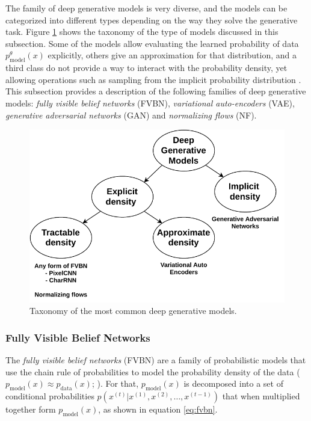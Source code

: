 The family of deep generative models is very diverse, and the models can be categorized into different types depending on the way they solve the generative task. Figure \ref{fig:generativetaxonomy} shows the taxonomy of the type of models discussed in this subsection. Some of the models allow evaluating the learned probability of data $p^\theta_\mathrm{model}(x)$ explicitly, others give an approximation for that distribution, and a third class do not provide a way to interact with the probability density, yet allowing operations such as sampling from the implicit probability distribution \autocite{Goodfellow2016}. This subsection provides a description of the following families of deep generative models: \textit{fully visible belief networks} (FVBN), \textit{variational auto-encoders} (VAE), \textit{generative adversarial networks} (GAN) and \textit{normalizing flows} (NF).

\begin{figure}[h!]
	\centering
	\includegraphics[width=0.85\linewidth]{background/images/generativetaxonomy}
	\caption[Taxonomy of deep generative models]{Taxonomy of the most common deep generative models.}
	\label{fig:generativetaxonomy}
\end{figure}


\subsubsection{Fully Visible Belief Networks}
The \textit{fully visible belief networks} (FVBN) are a family of probabilistic models that use the chain rule of probabilities to model the probability density of the data ($p_\mathrm{model}(x) \approx p_\mathrm{data}(x)$; \citealp{smith2018}). For that, $p_\mathrm{model}(x)$ is decomposed into a set of conditional probabilities $p(x^{(t)}| x^{(1)}, x^{(2)}, \ldots, x^{(t-1)})$ that when multiplied together form  $p_\mathrm{model}(x)$, as shown in equation \ref{eq:fvbn}.

